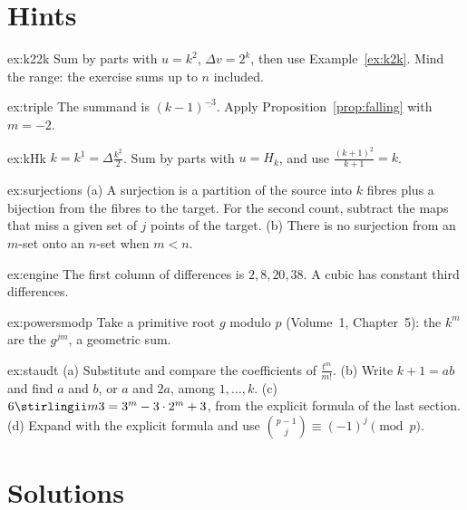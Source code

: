 \section{Hints}

\begin{hint}{ex:k22k}
Sum by parts with $u=k^2$, $\Delta v=2^k$, then use Example~\ref{ex:k2k}. Mind the range: the exercise sums up to $n$
included.
\end{hint}
\begin{hint}{ex:triple}
The summand is $(k-1)^{\underline{-3}}$. Apply Proposition~\ref{prop:falling} with $m=-2$.
\end{hint}
\begin{hint}{ex:kHk}
$k=k^{\underline1}=\Delta\frac{k^{\underline2}}2$. Sum by parts with $u=H_k$, and use $\frac{(k+1)^{\underline2}}{k+1}=k$.
\end{hint}
\begin{hint}{ex:surjections}
(a) A surjection is a partition of the source into $k$ fibres plus a bijection from the fibres to the target. For the
second count, subtract the maps that miss a given set of $j$ points of the target.
(b) There is no surjection from an $m$-set onto an $n$-set when $m<n$.
\end{hint}
\begin{hint}{ex:engine}
The first column of differences is $2,8,20,38$. A cubic has constant third differences.
\end{hint}
\begin{hint}{ex:powersmodp}
Take a primitive root $g$ modulo $p$ (Volume~1, Chapter~5): the $k^m$ are the $g^{jm}$, a geometric sum.
\end{hint}
\begin{hint}{ex:staudt}
(a) Substitute and compare the coefficients of $\frac{t^m}{m!}$. (b) Write $k+1=ab$ and find $a$ and $b$, or $a$ and $2a$,
among $1,\dots,k$. (c) $6\stirlingii m3=3^m-3\cdot2^m+3$, from the explicit formula of the last section. (d) Expand with the
explicit formula and use $\binom{p-1}j\equiv(-1)^j\pmod p$.
\end{hint}

\section{Solutions}

